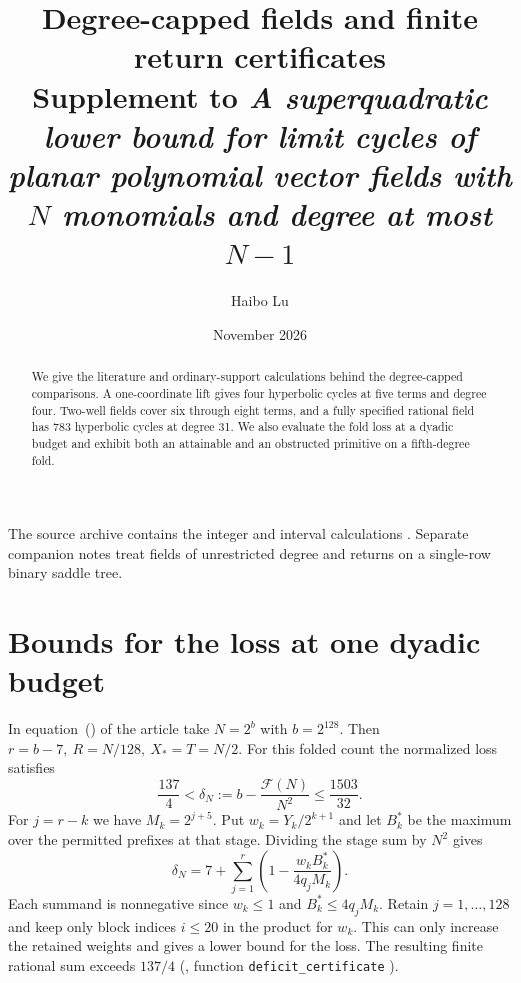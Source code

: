 
\renewcommand{\thesection}{S\arabic{section}}
\renewcommand{\thetable}{S\arabic{table}}
\setcounter{tocdepth}{1}
\makeatletter
\let\basesectiontoc\l@section
\renewcommand{\l@section}[2]{\begingroup\let\orig@numberline\numberline\renewcommand{\numberline}[1]{\makebox[2.5em][l]{##1}}\basesectiontoc{#1}{#2}\endgroup}
\makeatother
\title{Degree-capped fields and finite return certificates\\[4pt]\large Supplement to \emph{A superquadratic lower bound for limit cycles of planar polynomial vector fields with \(N\) monomials and degree at most \(N-1\)}}
\author{Haibo Lu}
\date{November 2026}

\maketitle
\begin{abstract}
We give the literature and ordinary-support calculations behind the degree-capped comparisons. A one-coordinate lift gives four hyperbolic cycles at five terms and degree four. Two-well fields cover six through eight terms, and a fully specified rational field has 783 hyperbolic cycles at degree 31. We also evaluate the fold loss at a dyadic budget and exhibit both an attainable and an obstructed primitive on a fifth-degree fold.
\end{abstract}
The source archive contains the integer and interval calculations \cite{LuReplay}. Separate companion notes treat fields of unrestricted degree and returns on a single-row binary saddle tree.

\tableofcontents








\clearpage
\section{Bounds for the loss at one dyadic budget}\label{sup:reproduction}
In equation~() of the article take \(N=2^b\) with \(b=2^{128}\). Then \(r=b-7,\ R=N/128,\ X_*=T=N/2\). For this folded count the normalized loss satisfies
\begin{equation}\label{eq:single-deficit}
 \frac{137}{4}<\delta_N:=b-\frac{\mathcal F(N)}{N^2}\le\frac{1503}{32}.
\end{equation}
For \(j=r-k\) we have \(M_k=2^{j+5}\). Put \(w_k=Y_k/2^{k+1}\) and let \(B_k^*\) be the maximum over the permitted prefixes at that stage. Dividing the stage sum by \(N^2\) gives
\[
 \delta_N=7+\sum_{j=1}^r\left(1-\frac{w_k B_k^*}{4q_j M_k}\right).
\]
Each summand is nonnegative since \(w_k\le1\) and \(B_k^*\le4q_jM_k\). Retain \(j=1,\ldots,128\) and keep only block indices \(i\le20\) in the product for \(w_k\). This can only increase the retained weights and gives a lower bound for the loss. The resulting finite rational sum exceeds \(137/4\) (, function \texttt{deficit\_certificate} \cite{LuReplay}).

